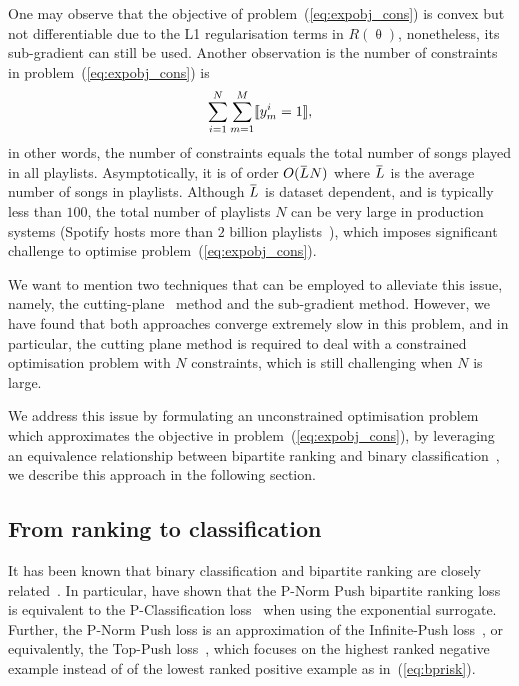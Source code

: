 One may observe that the objective of problem~(\ref{eq:expobj_cons}) is convex but not differentiable due to 
the L1 regularisation terms in $R(\uptheta)$, nonetheless, its sub-gradient can still be used.
Another observation is the number of constraints in problem~(\ref{eq:expobj_cons}) is
$$
\sum_{i=1}^N \sum_{m=1}^M \llbracket y_m^i = 1 \rrbracket,
$$
in other words, the number of constraints equals the total number of songs played in all playlists.
Asymptotically, it is of order $O(\widebar{L} N)$ where $\widebar{L}$ is the average number of songs in playlists.
Although $\widebar{L}$ is dataset dependent, and is typically less than $100$,
the total number of playlists $N$ can be very large in production systems (\eg Spotify hosts more than $2$ billion playlists~\cite{recsysch2018}),
which imposes significant challenge to optimise problem~(\ref{eq:expobj_cons}).

We want to mention two techniques that can be employed to alleviate this issue,
namely, the cutting-plane~\cite{avriel2003nonlinear} method and the sub-gradient method.
However, we have found that both approaches converge extremely slow in this problem, and in particular, the cutting plane method is required 
to deal with a constrained optimisation problem with $N$ constraints, which is still challenging when $N$ is large.

We address this issue by formulating an unconstrained optimisation problem which approximates the objective in problem~(\ref{eq:expobj_cons}),
by leveraging an equivalence relationship between bipartite ranking and binary classification~\cite{ertekin2011equivalence},
we describe this approach in the following section.




\subsection{From ranking to classification}

It has been known that binary classification and bipartite ranking are
closely related~\cite{ertekin2011equivalence,menon2016bipartite}.
In particular, \citet{ertekin2011equivalence} have shown that the P-Norm Push bipartite ranking loss~\cite{rudin2009p}
is equivalent to the P-Classification loss~\cite{ertekin2011equivalence} when using the exponential surrogate.
Further, the P-Norm Push loss is an approximation of the Infinite-Push loss~\cite{agarwal2011infinite},
or equivalently, the Top-Push loss~\cite{li2014top}, which focuses on the highest ranked negative example instead of
of the lowest ranked positive example as in~(\ref{eq:bprisk}).

